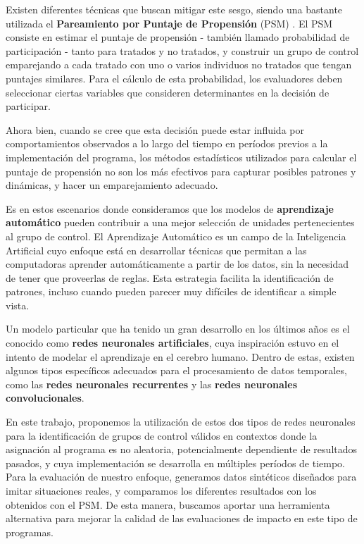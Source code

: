 \documentclass[../main.tex]{subfiles}
\begin{document}
Existen diferentes técnicas que buscan mitigar este sesgo, siendo una bastante utilizada
el \textbf{Pareamiento por Puntaje de Propensión} (PSM) \cite{psm1983}. El PSM consiste en
estimar el puntaje de propensión - también llamado probabilidad de participación - tanto
para tratados y no tratados, y construir un grupo de control emparejando a cada tratado
con uno o varios individuos no tratados que tengan puntajes similares. Para el cálculo de
esta probabilidad, los evaluadores deben seleccionar ciertas variables que consideren
determinantes en la decisión de participar.

Ahora bien, cuando se cree que esta decisión puede estar influida por comportamientos
observados a lo largo del tiempo en períodos previos a la implementación del programa, los
métodos estadísticos utilizados para calcular el puntaje de propensión no son los más
efectivos para capturar posibles patrones y dinámicas, y hacer un emparejamiento adecuado.

Es en estos escenarios donde consideramos que los modelos de \textbf{aprendizaje
automático} pueden contribuir a una mejor selección de unidades pertenecientes al grupo de
control. El Aprendizaje Automático es un campo de la Inteligencia Artificial cuyo enfoque
está en desarrollar técnicas que permitan a las computadoras aprender automáticamente a
partir de los datos, sin la necesidad de tener que proveerlas de reglas. Esta estrategia
facilita la identificación de patrones, incluso cuando pueden parecer muy difíciles de
identificar a simple vista.

Un modelo particular que ha tenido un gran desarrollo en los últimos años es el conocido
como \textbf{redes neuronales artificiales}, cuya inspiración estuvo en el intento de
modelar el aprendizaje en el cerebro humano. Dentro de estas, existen algunos tipos
específicos adecuados para el procesamiento de datos temporales, como las \textbf{redes
neuronales recurrentes} y las \textbf{redes neuronales convolucionales}.

En este trabajo, proponemos la utilización de estos dos tipos de redes neuronales para la
identificación de grupos de control válidos en contextos donde la asignación al programa
es no aleatoria, potencialmente dependiente de resultados pasados, y cuya implementación
se desarrolla en múltiples períodos de tiempo. Para la evaluación de nuestro enfoque,
generamos datos sintéticos diseñados para imitar situaciones reales, y comparamos los
diferentes resultados con los obtenidos con el PSM. De esta manera, buscamos aportar una
herramienta alternativa para mejorar la calidad de las evaluaciones de impacto en este
tipo de programas.
\end{document}
